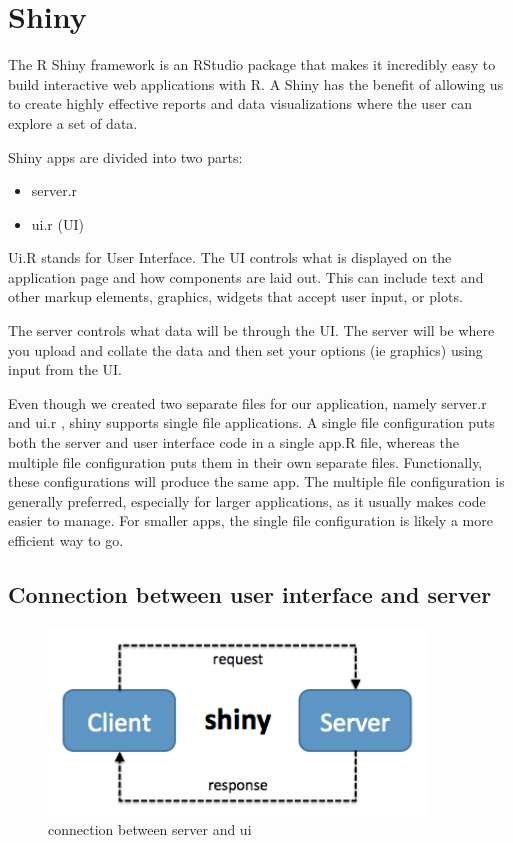 \documentclass[11pt,a4paper]{report}
\begin{document}
\section{Shiny}

The R Shiny framework is an RStudio package that makes it incredibly easy to build interactive web applications with R. A Shiny has the benefit of allowing us to create highly effective reports and data visualizations where the user can explore a set of data.

Shiny apps are divided into two parts: 

\begin{itemize}
    \item server.r
    \item ui.r (UI)
    
\end{itemize}
 
 Ui.R stands for User Interface. The UI controls what is displayed on the application page and how components are laid out. This can include text and other markup elements, graphics, widgets that accept user input, or plots.

 The server controls what data will be through the UI. The server will be where you upload and collate the data and then set your options (ie graphics) using input from the UI.

 
Even though we created two separate files for our application, namely server.r and ui.r , shiny supports single file applications. A single file configuration puts both the server and user interface code in a single app.R file, whereas the multiple file configuration puts them in their own separate files. Functionally, these configurations will produce the same app. The multiple file configuration is generally preferred, especially for larger applications, as it usually makes code easier to manage. For smaller apps, the single file configuration is likely a more efficient way to go.
 
\subsection{Connection between user interface and server}
\begin{figure}[h]
\centering %
\includegraphics[width=10cm]{images/post-logo.PNG} 

\caption{connection between server and ui}
\label{figura:qualquernome}
\end{figure}
 
\end{document}

